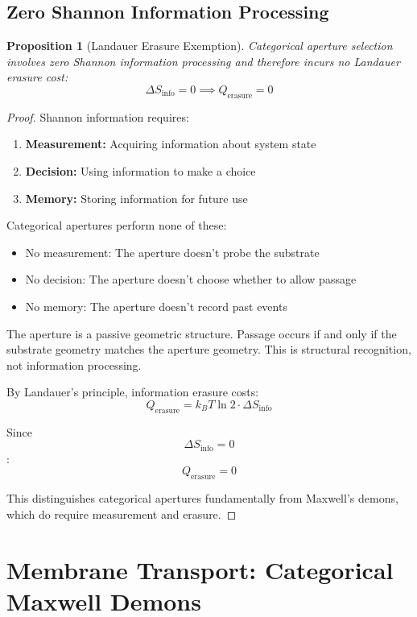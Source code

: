 \documentclass[12pt,a4paper]{article}
\newtheorem{proposition}[theorem]{Proposition}
\begin{document}
\subsection{Zero Shannon Information Processing}

\begin{proposition}[Landauer Erasure Exemption]
Categorical aperture selection involves zero Shannon information processing and therefore incurs no Landauer erasure cost:
$$
\Delta S_{\text{info}} = 0 \implies Q_{\text{erasure}} = 0
$$
\end{proposition}

\begin{proof}
Shannon information requires:
\begin{enumerate}
\item \textbf{Measurement:} Acquiring information about system state
\item \textbf{Decision:} Using information to make a choice
\item \textbf{Memory:} Storing information for future use
\end{enumerate}

Categorical apertures perform none of these:
\begin{itemize}
\item No measurement: The aperture doesn't probe the substrate
\item No decision: The aperture doesn't choose whether to allow passage
\item No memory: The aperture doesn't record past events
\end{itemize}

The aperture is a passive geometric structure. Passage occurs if and only if the substrate geometry matches the aperture geometry. This is structural recognition, not information processing.

By Landauer's principle, information erasure costs:
$$
Q_{\text{erasure}} = k_B T \ln 2 \cdot \Delta S_{\text{info}}
$$

Since $$\Delta S_{\text{info}} = 0$$:
$$
Q_{\text{erasure}} = 0
$$

This distinguishes categorical apertures fundamentally from Maxwell's demons, which do require measurement and erasure.
\end{proof}

\section{Membrane Transport: Categorical Maxwell Demons}
\end{document}
